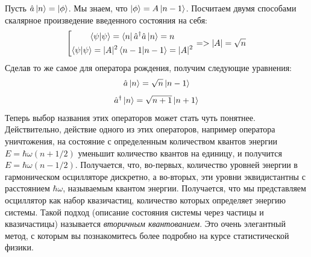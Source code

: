 Пусть $\hat{a}\ket{n} = \ket{\phi}$. Мы знаем, что $\ket{\phi} = A\ket{n-1}$. Посчитаем двумя способами скалярное произведение введенного состояния на себя:
\[
\left[
\begin{gathered}
\bra{\psi}\ket{\psi} = \bra{n}\hat{a}^{\dagger}\hat{a}\ket{n} = n\\
\bra{\psi}\ket{\psi} = |A|^2\bra{n-1}\ket{n-1} = |A|^2
\end{gathered}
\right. => |A| = \sqrt{n}
\]
Сделав то же самое для оператора рождения, получим следующие уравнения:
\[
\hat{a}\ket{n} = \sqrt{n}\ket{n-1}
\]
\[
\hat{a}^{\dagger}\ket{n} = \sqrt{n+1}\ket{n+1}
\]
Теперь выбор названия этих операторов может стать чуть понятнее. Действительно, действие одного из этих операторов, например оператора уничтожения, на состояние с определенным количеством квантов энергии $E = \hbar\omega(n + 1/2)$ уменьшит количество квантов на единицу, и получится $E = \hbar\omega(n - 1/2)$. Получается, что, во-первых, количество уровней энергии в гармоническом осцилляторе дискретно, а во-вторых, эти уровни эквидистантны с расстоянием $\hbar\omega$, называемым квантом энергии. Получается, что мы представляем осциллятор как набор квазичастиц, количество которых определяет энергию системы. Такой подход (описание состояния системы через частицы и квазичастицы) называется \textit{вторичным квантованием}. Это очень элегантный метод, с которым вы познакомитесь более подробно на курсе статистической физики.

